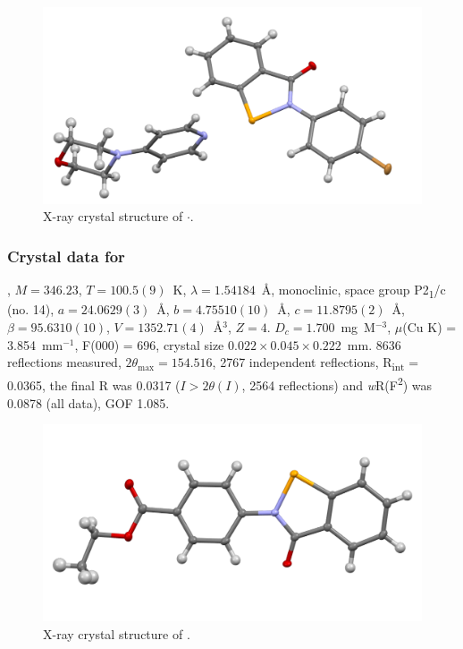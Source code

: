 \begin{refsection}
\begin{figure}
  \includegraphics[width=0.6\linewidth]{Figures/ebs-4br-morph-xtal.pdf}
  \caption{X-ray crystal structure of \texorpdfstring{$ \cdot $}{C22 H20 Br N3 O2 Se}.}
\end{figure}

\subsubsection{Crystal data for \texorpdfstring{}{C16 H13 N O3 Se}}
, $M=346.23$, $T=100.5(9)$~K, $\lambda=1.54184$~\AA, monoclinic, space group P2\textsubscript{1}/c (no. 14), $a = 24.0629(3)$~\AA, $b = 4.75510(10)$~\AA, $c = 11.8795(2)$~\AA, $\beta = 95.6310(10)$\degree, $V = 1352.71(4)$~\AA$^{3}$, $Z = 4$. $D_{c}= 1.700$~mg~M$^{-3}$, $\mu$(Cu K\a) = 3.854~mm$^{-1}$, F(000) = 696, crystal size $0.022 \times 0.045 \times 0.222$~mm. 8636 reflections measured, $2\theta_{\max}=154.516$\degree, 2767 independent reflections, R\textsubscript{int} = 0.0365, the final R was 0.0317 ($I > 2\theta(I)$, 2564 reflections) and \textit{w}R(F\textsuperscript{2}) was 0.0878 (all data), GOF 1.085.

\begin{figure}
  \includegraphics[width=0.6\linewidth]{Figures/ebs-4co2et-xtal.pdf}
  \caption{X-ray crystal structure of \texorpdfstring{}{C16 H13 N O3 Se}.}
\end{figure}


\end{refsection}
